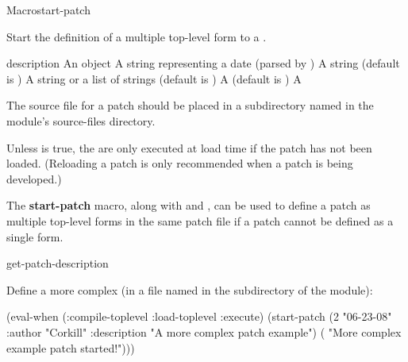 \documentclass[10pt,twoside,english,pdftex]{article}
\begin{document}
\begin{functiondoc}{Macro}{start-patch}%
  {\code{(}
     \code{)}
    \superstar} 
%
%

\fnsyntax 

\fnpurpose Start the definition of a multiple top-level form  to
a .

\fnpackage {}

\fnmodule {}

\fnargs
\begin{args}{description}
\arg[id] An object
\arg[date] A string representing a date (parsed by 
  \textbf{})
\arg[author] A string (default is )
\arg[description] A string or a list of strings (default is \nil)
\arg[reload] A  (default is \nil)
\arg[form] A 
\end{args}

\fndescription 
%
The source file for a patch should be placed in a subdirectory named
 in the module's source-files directory.

Unless  is true, the   are only executed
at load time if the patch has not been loaded.  (Reloading a patch is only
recommended when a patch is being developed.)

The \textbf{start-patch} macro, along with \textbf{}
and \textbf{}, can be used to define a patch as multiple
top-level forms in the same patch file if a patch cannot be defined as a
single \textbf{} form.

\begin{alsos}{get-patch-description}
\also[patch]
\also[undefmethod]
\end{alsos}

\fnexample 
%
Define a more complex  (in a file named 
in the  subdirectory of the module):
%
%
%
%
%
\W\supp
\begin{example}
  (eval-when (:compile-toplevel :load-toplevel :execute)
    (start-patch (2 "06-23-08" 
                    :author "Corkill"
                    :description "A more complex patch example")
        ( "More complex example patch started!")))


\end{example}
\end{functiondoc}
\end{document}
